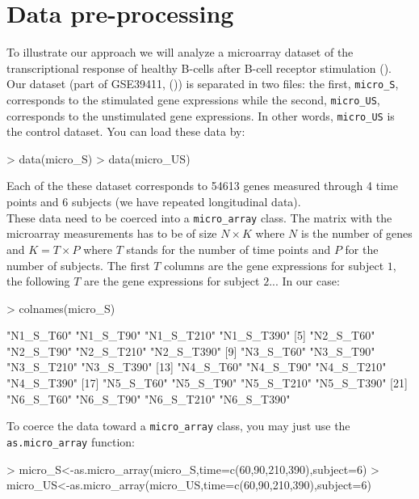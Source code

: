 \documentclass[a4paper]{article}
\begin{document}
\section{Data pre-processing}

To illustrate our approach  we will analyze a microarray dataset of the transcriptional response of healthy B-cells after B-cell receptor stimulation (\cite{vallat2007temporal}). 
Our dataset (part of GSE39411, (\cite{vallat2007temporal}))   is separated in two files: the first, \texttt{micro\_S},  corresponds to the stimulated gene expressions while the second, \texttt{micro\_US}, corresponds to the unstimulated gene expressions. 
In other words, \texttt{micro\_US} is the control dataset. You can load these data by:


\begin{Schunk}
\begin{Sinput}
> data(micro_S)
> data(micro_US)
\end{Sinput}
\end{Schunk}



Each of the these dataset corresponds to 54613 genes measured through 4 time points and  6 subjects (we have repeated longitudinal data). \\
These data need to be coerced into a \texttt{micro\_array} class.  The matrix with the microarray measurements has to be of size $N \times K$ where $N$ is the number of genes and $K=T \times P$ where $T$ stands for the number of time points and $P$ for the number of subjects. The first $T$ columns are the gene expressions for subject $1$, the following $T$ are the gene expressions for subject $2$... In our case:

\begin{Schunk}
\begin{Sinput}
> colnames(micro_S)
\end{Sinput}
\begin{Soutput}
 [1] "N1_S_T60"  "N1_S_T90"  "N1_S_T210" "N1_S_T390"
 [5] "N2_S_T60"  "N2_S_T90"  "N2_S_T210" "N2_S_T390"
 [9] "N3_S_T60"  "N3_S_T90"  "N3_S_T210" "N3_S_T390"
[13] "N4_S_T60"  "N4_S_T90"  "N4_S_T210" "N4_S_T390"
[17] "N5_S_T60"  "N5_S_T90"  "N5_S_T210" "N5_S_T390"
[21] "N6_S_T60"  "N6_S_T90"  "N6_S_T210" "N6_S_T390"
\end{Soutput}
\end{Schunk}

To coerce the data toward a \texttt{micro\_array} class, you may just use the \texttt{as.micro\_array} function:
\begin{Schunk}
\begin{Sinput}
> micro_S<-as.micro_array(micro_S,time=c(60,90,210,390),subject=6)
> micro_US<-as.micro_array(micro_US,time=c(60,90,210,390),subject=6)
\end{Sinput}
\end{Schunk}
\end{document}
